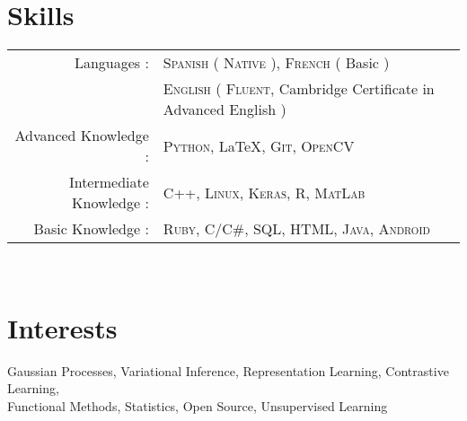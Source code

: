 \documentclass[a4paper,10pt]{article} %
\begin{document}
\section{Skills}

\begin{tabular}{rl}

  Languages : & \textsc{Spanish} ( \textsc{Native} ), \textsc{French} ( Basic ) \\
  & \textsc{English} ( \textsc{Fluent}, Cambridge Certificate in Advanced English ) \\


Advanced Knowledge : & \textsc{Python}, { \LaTeX}, %
\textsc{Git}, \textsc{OpenCV}\\

Intermediate Knowledge : &  \textsc{C++},  \textsc{Linux}, \textsc{Keras}, \textsc{R}, \textsc{MatLab} \\

Basic Knowledge : & \textsc{Ruby}, \textsc{C/C\#},  \textsc{SQL}, \textsc{HTML}, \textsc{Java}, \textsc{Android}\\


\end{tabular}\\


\section{Interests}

Gaussian Processes, Variational Inference, Representation Learning,  Contrastive Learning, \\ Functional Methods, Statistics, Open Source, Unsupervised Learning
\end{document}
